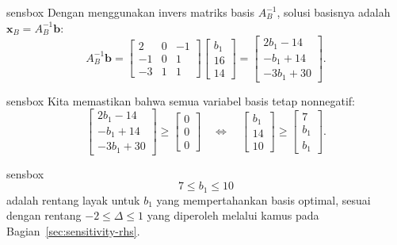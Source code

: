 \begin{steppanel}{sensbox}
Dengan menggunakan invers matriks basis \( A_B^{-1} \), solusi basisnya adalah \( \mathbf{x}_B = A_B^{-1} \mathbf{b} \):
\[
A_B^{-1} \mathbf{b} = \begin{bmatrix}
2 & 0 & -1\\
-1 & 0 & 1\\
-3 & 1 & 1
\end{bmatrix} \begin{bmatrix} b_1\\ 16\\ 14 \end{bmatrix}
=
\begin{bmatrix}
2b_1 - 14\\
-b_1 + 14\\
-3b_1 + 30
\end{bmatrix}.
\]
\end{steppanel}

\begin{steppanel}{sensbox}
Kita memastikan bahwa semua variabel basis tetap nonnegatif:
\[
\begin{bmatrix}
2b_1 - 14\\
-b_1 + 14\\
-3b_1 + 30
\end{bmatrix} \geq
\begin{bmatrix}
0\\
0\\
0
\end{bmatrix}
\quad\Longleftrightarrow\quad
\begin{bmatrix}
b_1 \\
14\\
10
\end{bmatrix} \geq
\begin{bmatrix}
7\\
b_1\\
b_1
\end{bmatrix}.
\]
\end{steppanel}

\begin{steppanel}{sensbox}
\[
\boxed{7 \leq b_1 \leq 10}
\]
adalah rentang layak untuk \( b_1 \) yang mempertahankan basis optimal, sesuai dengan rentang \( -2 \le \Delta \le 1 \) yang diperoleh melalui kamus pada Bagian~\ref{sec:sensitivity-rhs}.
\end{steppanel}


